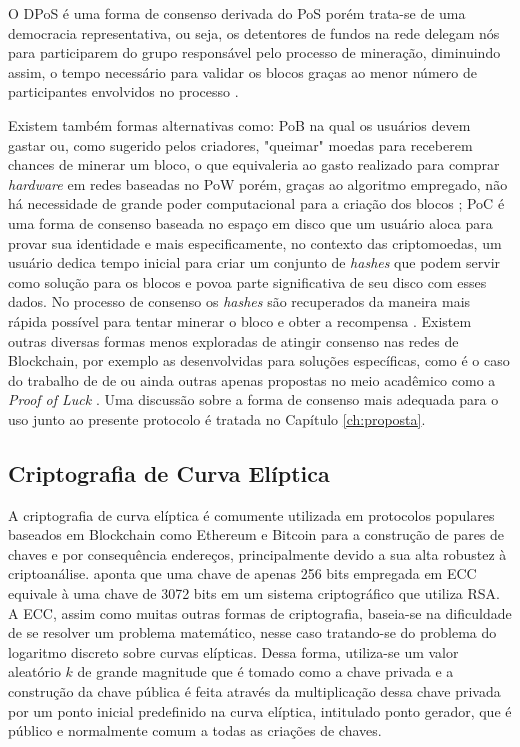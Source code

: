%
O \ac{DPoS} é uma forma de consenso derivada do \ac{PoS} porém trata-se de uma democracia representativa, ou seja, os detentores de fundos na rede delegam nós para participarem do grupo responsável pelo processo de mineração, diminuindo assim, o tempo necessário para validar os blocos graças ao menor número de participantes envolvidos no processo \cite{blockchain:survey}. 

%
Existem também formas alternativas como: \ac{PoB} na qual os usuários devem gastar ou, como sugerido pelos criadores, "queimar" moedas para receberem chances de minerar um bloco, o que equivaleria ao gasto realizado para comprar \textit{hardware} em redes baseadas no \ac{PoW} porém, graças ao algoritmo empregado, não há necessidade de grande poder computacional para a criação dos blocos \cite{blockchain:PoB}; \ac{PoC} é uma forma de consenso baseada no espaço em disco que um usuário aloca para provar sua identidade \cite{blockchain:origem_PoC} e mais especificamente, no contexto das criptomoedas, um usuário dedica tempo inicial para criar um conjunto de \textit{hashes} que podem servir como solução para os blocos e povoa parte significativa de seu disco com esses dados. No processo de consenso os \textit{hashes} são recuperados da maneira mais rápida possível para tentar minerar o bloco e obter a recompensa \cite{blockchain:burstcoin_PoC}. Existem outras diversas formas menos exploradas de atingir consenso nas redes de Blockchain, por exemplo as desenvolvidas para soluções específicas, como é o caso do trabalho de \citeauthor{blockchain:energia_dc} de \citeyear{blockchain:energia_dc} ou ainda outras apenas propostas no meio acadêmico como a \textit{Proof of Luck} \cite{blockchain:PoL}. Uma discussão sobre a forma de consenso mais adequada para o uso junto ao presente protocolo é tratada no Capítulo \ref{ch:proposta}.

\subsection{Criptografia de Curva Elíptica}
\label{subsec:ecc}

A criptografia de curva elíptica é comumente utilizada em protocolos populares baseados em Blockchain  como Ethereum \cite{blockchain:ethereum} e Bitcoin \cite{blockchain:documentacao_bitcoin} para a construção de pares de chaves e por consequência endereços, principalmente devido a sua alta robustez à criptoanálise.  aponta que uma chave de apenas 256 bits empregada em \ac{ECC} equivale à uma chave de 3072 bits em um sistema criptográfico que utiliza RSA. A \ac{ECC}, assim como muitas outras formas de criptografia, baseia-se na dificuldade de se resolver um problema matemático, nesse caso tratando-se do problema do logaritmo discreto sobre curvas elípticas. Dessa forma, utiliza-se um valor aleatório $k$ de grande magnitude que é tomado como a chave privada e a construção da chave pública é feita através da multiplicação dessa chave privada por um ponto inicial predefinido na curva elíptica, intitulado ponto gerador, que é público e normalmente comum a todas as criações de chaves.

